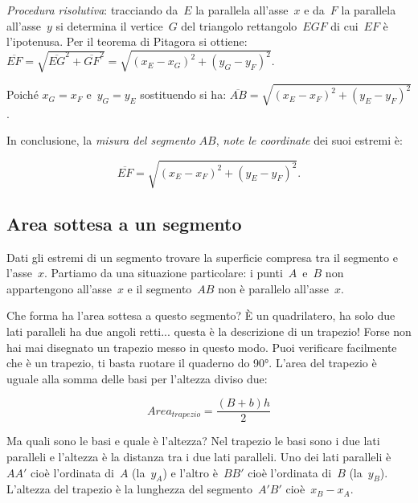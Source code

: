 \emph{Procedura risolutiva}: tracciando da~$E$ la parallela all'asse~$x$ 
e da~$F$ la parallela all'asse~$y$ si determina il vertice~$G$ del triangolo 
rettangolo~$EGF$ di cui~$EF$ è l'ipotenusa.
Per il teorema di Pitagora si 
ottiene:~$\overline{EF}=\sqrt{\overline{EG}^2 + \overline{GF}^2}=
\sqrt{\left(x_E-x_G \right)^2+\left(y_G-y_F \right)^2}$. %

Poiché $x_{G}=x_{F}$ e~$y_{G}=y_{E}$ sostituendo si ha:
$\overline{AB}=\sqrt{\left(x_{E}-x_{F}\right)^{2}+\left(y_{E}-y_{F}\right)^{2}}$.

In conclusione, la \emph{misura del segmento} $AB$, \emph{note le coordinate} 
dei suoi estremi è:

\[\overline{EF}=\sqrt{\left(x_{E}-x_{F}\right)^{2}+\left(y_{E}-y_{F}\right)^{2}}.\]


\subsection{Area sottesa a un segmento}

Dati gli estremi di un segmento trovare la superficie compresa tra il 
segmento e l'asse~$x$. Partiamo da una situazione particolare:
i punti~$A$~e~$B$ non appartengono all'asse~$x$ e il segmento~$AB$ non 
è parallelo all'asse~$x$.


\begin{center} \areasottesauno \end{center}

Che forma ha l'area sottesa a questo segmento? È un quadrilatero, ha solo due 
lati paralleli ha due angoli retti... questa è la descrizione di un trapezio!
Forse non hai mai disegnato un trapezio messo in questo modo. Puoi verificare 
facilmente che è un trapezio, ti basta ruotare il quaderno do 90°. 
L'area del trapezio è uguale alla somma delle basi per l'altezza diviso due:

\[Area_{trapezio}= \frac{(B+b)h}{2}\]

Ma quali sono le basi e quale è l'altezza? Nel trapezio le basi sono i due 
lati paralleli e l'altezza è la distanza tra i due lati paralleli.
Uno dei lati paralleli è~$AA'$ cioè l'ordinata di~$A$ (la~$y_A$) 
e l'altro è~$BB'$ cioè l'ordinata di~$B$ (la~$y_B$).
L'altezza del trapezio è la lunghezza del segmento~$A'B'$ 
cioè~$x_B - x_A$.

